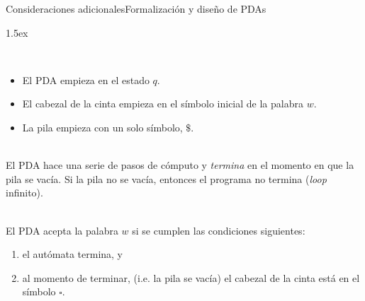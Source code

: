 \documentclass[spanish]{beamer}
\begin{document}
{%
\begin{frame}{Consideraciones adicionales}{Formalización y diseño de PDAs}
    \begin{description}
        \itemsep1.5ex
        \item[Configuración inicial] \hfill \\ 
        \begin{itemize}
            \item El PDA empieza en el estado $q$. \pause 
            \item El cabezal de la cinta empieza en el símbolo inicial de la palabra $w$. \pause 
            \item La pila empieza con un solo símbolo, $\$$. \pause 
        \end{itemize}

        \item[Cómputo y terminación] \hfill \\ 
        El PDA hace una serie de pasos de cómputo y \textit{termina} en el momento en que la pila se vacía. Si la pila no se vacía, entonces el programa no termina (\textit{loop} infinito). \pause 
        \item[Aceptación] \hfill \\ 
        El PDA acepta la palabra $w$ si se cumplen las condiciones siguientes:
        \begin{enumerate}
            \item el autómata termina, y \pause 
            \item al momento de terminar, (i.e. la pila se vacía) el cabezal de la cinta está en el símbolo $\square$.
        \end{enumerate}
    \end{description}
\end{frame}
}
\end{document}
